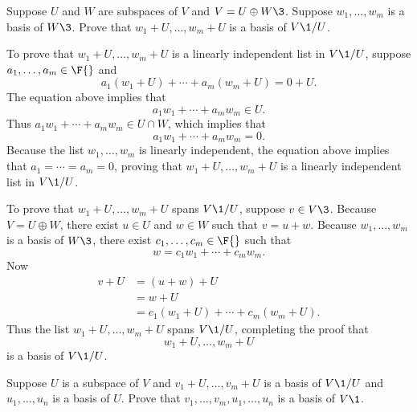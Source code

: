 \exercise
Suppose $U$ and $W$ are subspaces of $V$ and $V = U \oplus W\3$. Suppose $w_1, \ldots, w_m$ is a basis of $W\3$. Prove that
$w_1 + U, \ldots, w_m + U$ is a basis of $V\1/U$.

\begin{Solution}
To prove that $w_1 + U, \ldots, w_m + U$ is a linearly independent list in $V\1/U$, suppose $a_1, \ldots, a_m \in \F{}$ and
\[
a_1(w_1 + U) + \cdots + a_m(w_m + U) = 0 + U.
\]
The equation above implies that
\[
a_1 w_1 + \cdots + a_m w_m \in U.
\]
Thus $a_1 w_1 + \cdots + a_m w_m \in U \cap W$, which implies that
\[
a_1 w_1 + \cdots + a_m w_m = 0.
\]
Because the list $w_1, \ldots, w_m$ is linearly independent, the equation above implies that $a_1 = \cdots = a_m = 0$, proving that
$w_1 + U, \ldots, w_m + U$ is a linearly independent list in $V\1/U$.

To prove that $w_1 + U, \ldots, w_m + U$ spans $V\1/U$, suppose $v \in V\3$. Because $V = U \oplus W$, there exist $u \in U$ and
$w \in W$ such that $v= u + w$. Because $w_1, \ldots, w_m$ is a basis of $W\3$, there exist $c_1, \ldots, c_m \in \F{}$ such that
\[
w = c_1 w_1 + \cdots + c_m w_m.
\]
Now
\begin{align*}
v + U &= (u + w) + U \\
&= w + U \\
&= c_1(w_1 + U) + \cdots + c_m(w_m + U).
\end{align*}
Thus the list $w_1 + U, \ldots, w_m + U$ spans $V\1/U$, completing the proof that
\[
w_1 + U, \ldots, w_m + U
\]
is a basis of $V\1/U$.
\end{Solution}

\exercise
Suppose $U$ is a subspace of $V$ and $v_1 + U, \dots, v_m + U$ is a basis of $V\1/U$ and $u_1, \dots, u_n$ is a basis of $U$. Prove that $v_1, \dots, v_m, u_1, \dots, u_n$ is a basis of $V\1$. \label{basisUVmodU}

